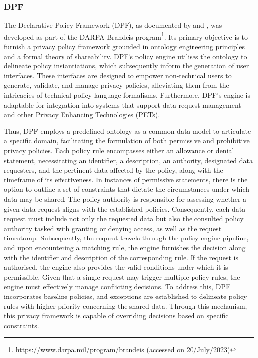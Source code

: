 \subsubsection{DPF}
\label{sec:dpf}

The Declarative Policy Framework (DPF), as documented by \cite{martiny_protecting_2018} and \cite{martiny_partial_2020}, was developed as part of the DARPA Brandeis program\footnote{\url{https://www.darpa.mil/program/brandeis} (accessed on 20/July/2023)}.
Its primary objective is to furnish a privacy policy framework grounded in ontology engineering principles and a formal theory of shareability.
DPF's policy engine utilises the ontology to delineate policy instantiations, which subsequently inform the generation of user interfaces. 
These interfaces are designed to empower non-technical users to generate, validate, and manage privacy policies, alleviating them from the intricacies of technical policy language formalisms.
Furthermore, DPF's engine is adaptable for integration into systems that support data request management and other Privacy Enhancing Technologies (PETs).

Thus, DPF employs a predefined ontology as a common data model to articulate a specific domain, facilitating the formulation of both permissive and prohibitive privacy policies. 
Each policy rule encompasses either an allowance or denial statement, necessitating an identifier, a description, an authority, designated data requesters, and the pertinent data affected by the policy, along with the timeframe of its effectiveness. 
In instances of permissive statements, there is the option to outline a set of constraints that dictate the circumstances under which data may be shared. 
The policy authority is responsible for assessing whether a given data request aligns with the established policies.
Consequently, each data request must include not only the requested data but also the consulted policy authority tasked with granting or denying access, as well as the request timestamp.
Subsequently, the request travels through the policy engine pipeline, and upon encountering a matching rule, the engine furnishes the decision along with the identifier and description of the corresponding rule.
If the request is authorised, the engine also provides the valid conditions under which it is permissible. 
Given that a single request may trigger multiple policy rules, the engine must effectively manage conflicting decisions.
To address this, DPF incorporates baseline policies, and exceptions are established to delineate policy rules with higher priority concerning the shared data. 
Through this mechanism, this privacy framework is capable of overriding decisions based on specific constraints.

